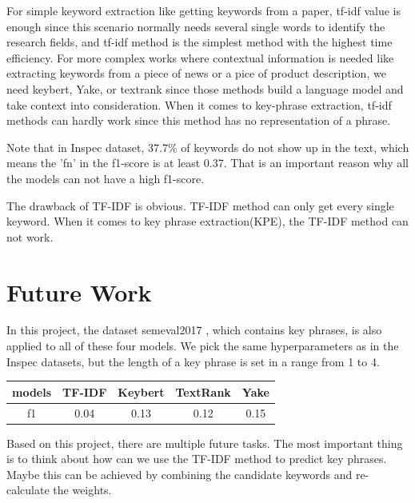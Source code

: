 \documentclass[11pt]{article}
\begin{document}
\vspace{11pt}
  \noindent
   For simple keyword extraction like getting keywords from a paper, tf-idf value is enough since this scenario normally needs several single words to identify the research fields, and tf-idf method is the simplest method with the highest time efficiency. For more complex works where contextual information is needed like extracting keywords from a piece of news or a pice of product description, we need keybert, Yake, or textrank since those methods build a language model and take context into consideration. When it comes to key-phrase extraction, tf-idf methods can hardly work since this method has no representation of a phrase.
    
 \vspace{11pt}
  \noindent
  Note that in Inspec dataset, 37.7$\%$ of keywords do not show up in the text, which means the 'fn' in the f1-score is at least
  0.37. That is an important reason why all the models can not have a high f1-score.

  
  \vspace{11pt}
  \noindent
  The drawback of TF-IDF is obvious. TF-IDF method can only get every single keyword. When it comes
  to key phrase extraction(KPE), the TF-IDF method can not work. 
  
  \section{Future Work}
  In this project, the dataset semeval2017 \cite{augenstein-etal-2017-semeval} 
  , which contains key phrases, is also applied to all of these four models. We pick the same hyperparameters as in the Inspec datasets, but the length
  of a key phrase is set in a range from 1 to 4.
  \vspace{11pt}
  \begin{center}
      \begin{tabular}{ccccc}
          \hline
          models& TF-IDF& Keybert& TextRank& Yake\\
          \hline
          f1& 0.04& 0.13& 0.12& 0.15 \\
          \hline
      \end{tabular}
  \end{center}
  
  \noindent
  \vspace{11pt}
  
  Based on this project, there are multiple future tasks. The most important thing is to think about how can we use the TF-IDF method to predict key phrases. Maybe this can be achieved by combining the candidate keywords and re-calculate the weights.
  
\end{document}
